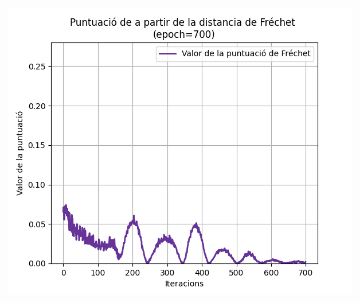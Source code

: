 \begin{figure}[H]
\begin{subfigure}[b]{.32\linewidth}
		\includegraphics[width=\linewidth]{figures/data/FD_score_6.png}
		\caption{}
	\end{subfigure}
	

\end{figure}
